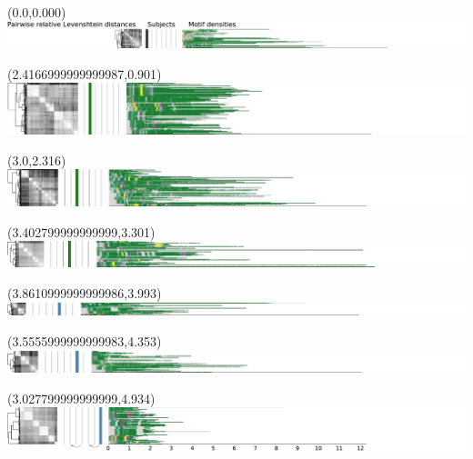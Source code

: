 \documentclass{article}
\begin{document}
\begin{textblock}{13}(0.0,0.000)\includegraphics{haplotypes-constrained/5qtel_1-500K_1_12_12_rc-HG001.pdf}\end{textblock}
\begin{textblock}{13}(2.4166999999999987,0.901)\includegraphics{haplotypes-constrained/5qtel_1-500K_1_12_12_rc-HG002.pdf}\end{textblock}
\begin{textblock}{13}(3.0,2.316)\includegraphics{haplotypes-constrained/5qtel_1-500K_1_12_12_rc-HG003.pdf}\end{textblock}
\begin{textblock}{13}(3.402799999999999,3.301)\includegraphics{haplotypes-constrained/5qtel_1-500K_1_12_12_rc-HG004.pdf}\end{textblock}
\begin{textblock}{13}(3.8610999999999986,3.993)\includegraphics{haplotypes-constrained/5qtel_1-500K_1_12_12_rc-HG005.pdf}\end{textblock}
\begin{textblock}{13}(3.5555999999999983,4.353)\includegraphics{haplotypes-constrained/5qtel_1-500K_1_12_12_rc-HG006.pdf}\end{textblock}
\begin{textblock}{13}(3.027799999999999,4.934)\includegraphics{haplotypes-constrained/5qtel_1-500K_1_12_12_rc-HG007.pdf}\end{textblock}
\end{document}
